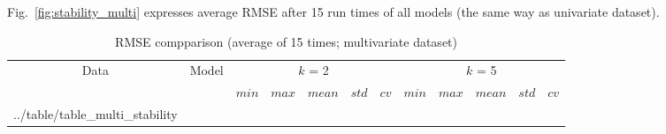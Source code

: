 \documentclass[smallcondensed, natbib]{svjour3}     %
\makeatletter
\newcommand\primitiveinput[1]
		{\@@input #1 }
\makeatother
\begin{document}
{Fig.~\ref{fig:stability_multi} expresses average RMSE after 15 run times of all models (the same way as univariate dataset).

\begin{table}[h]
	\caption{RMSE compparison (average of 15 times; multivariate dataset)}
	\label{table:multi_stability}
	\centering
	\begin{adjustbox}{width=\textwidth}
		\begin{tabular}{| c | c| c | c | c | c | c | c | c | c | c | c |}%
		\hline
			 \multirow{2}{*}{Data} & \multirow{2}{*}{Model} & \multicolumn{5}{c|}{$k$ = 2} & \multicolumn{5}{c|}{ $k$ = 5 } \\ 
			 \cline{3-12}
	   		& & $min$ & $max$ & $mean$ & $std$ & $cv$ &   $min$ & $max$ & $mean$ & $std$ & $cv$ \\ [0.5ex] 
		\hline
			\primitiveinput{../table/table_multi_stability}
		\hline
		\end{tabular}
	\end{adjustbox}
\end{table}


}
\end{document}
